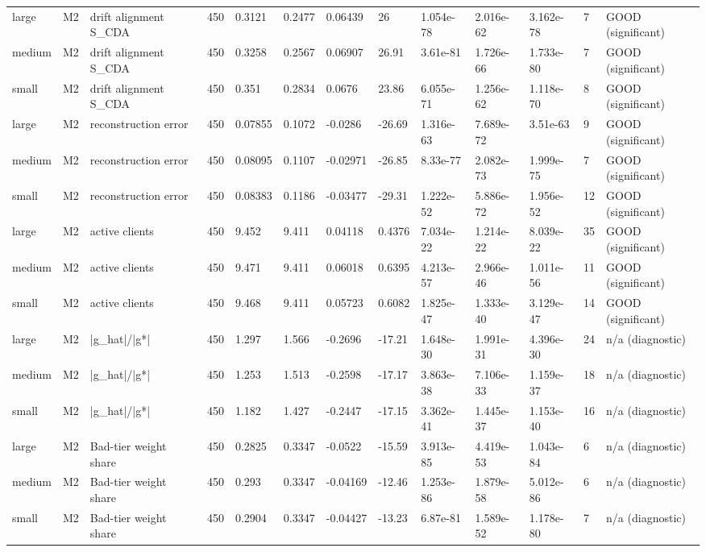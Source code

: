 \begin{table}[t]
\begin{tabular}{lllllllllllll}
large & M2 & drift alignment S\_CDA & 450 & 0.3121 & 0.2477 & 0.06439 & 26 & 1.054e-78 & 2.016e-62 & 3.162e-78 & 7 & GOOD (significant) \\
medium & M2 & drift alignment S\_CDA & 450 & 0.3258 & 0.2567 & 0.06907 & 26.91 & 3.61e-81 & 1.726e-66 & 1.733e-80 & 7 & GOOD (significant) \\
small & M2 & drift alignment S\_CDA & 450 & 0.351 & 0.2834 & 0.0676 & 23.86 & 6.055e-71 & 1.256e-62 & 1.118e-70 & 8 & GOOD (significant) \\
large & M2 & reconstruction error & 450 & 0.07855 & 0.1072 & -0.0286 & -26.69 & 1.316e-63 & 7.689e-72 & 3.51e-63 & 9 & GOOD (significant) \\
medium & M2 & reconstruction error & 450 & 0.08095 & 0.1107 & -0.02971 & -26.85 & 8.33e-77 & 2.082e-73 & 1.999e-75 & 7 & GOOD (significant) \\
small & M2 & reconstruction error & 450 & 0.08383 & 0.1186 & -0.03477 & -29.31 & 1.222e-52 & 5.886e-72 & 1.956e-52 & 12 & GOOD (significant) \\
large & M2 & active clients & 450 & 9.452 & 9.411 & 0.04118 & 0.4376 & 7.034e-22 & 1.214e-22 & 8.039e-22 & 35 & GOOD (significant) \\
medium & M2 & active clients & 450 & 9.471 & 9.411 & 0.06018 & 0.6395 & 4.213e-57 & 2.966e-46 & 1.011e-56 & 11 & GOOD (significant) \\
small & M2 & active clients & 450 & 9.468 & 9.411 & 0.05723 & 0.6082 & 1.825e-47 & 1.333e-40 & 3.129e-47 & 14 & GOOD (significant) \\
large & M2 & |g\_hat|/|g*| & 450 & 1.297 & 1.566 & -0.2696 & -17.21 & 1.648e-30 & 1.991e-31 & 4.396e-30 & 24 & n/a (diagnostic) \\
medium & M2 & |g\_hat|/|g*| & 450 & 1.253 & 1.513 & -0.2598 & -17.17 & 3.863e-38 & 7.106e-33 & 1.159e-37 & 18 & n/a (diagnostic) \\
small & M2 & |g\_hat|/|g*| & 450 & 1.182 & 1.427 & -0.2447 & -17.15 & 3.362e-41 & 1.445e-37 & 1.153e-40 & 16 & n/a (diagnostic) \\
large & M2 & Bad-tier weight share & 450 & 0.2825 & 0.3347 & -0.0522 & -15.59 & 3.913e-85 & 4.419e-53 & 1.043e-84 & 6 & n/a (diagnostic) \\
medium & M2 & Bad-tier weight share & 450 & 0.293 & 0.3347 & -0.04169 & -12.46 & 1.253e-86 & 1.879e-58 & 5.012e-86 & 6 & n/a (diagnostic) \\
small & M2 & Bad-tier weight share & 450 & 0.2904 & 0.3347 & -0.04427 & -13.23 & 6.87e-81 & 1.589e-52 & 1.178e-80 & 7 & n/a (diagnostic) \\

\end{tabular}
\end{table}
